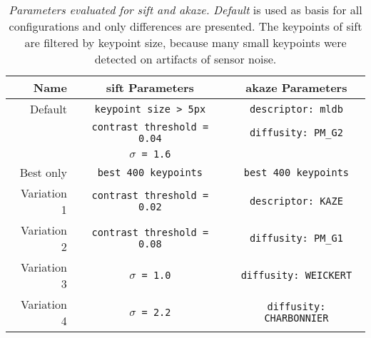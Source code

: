 \begin{table}[H]
    {\renewcommand{\arraystretch}{1.2}%
    \setlength{\tabcolsep}{0.8em}%
    \footnotesize
    \begin{tabular}{rcc}
    \toprule
    \textbf{Name}   & \textbf{\acrshort{sift} Parameters} & \textbf{\acrshort{akaze} Parameters} \\
    \midrule
        Default     & \texttt{keypoint size > 5px}        & \texttt{descriptor: \acrshort{mldb}} \\
        \null       & \texttt{contrast threshold = 0.04}  & \texttt{diffusity: PM\_G2} \\
        \null       & \texttt{$\sigma$ = 1.6}             & \null \\
        Best only   & \texttt{best 400 keypoints}         & \texttt{best 400 keypoints} \\
        Variation 1 & \texttt{contrast threshold = 0.02}  & \texttt{descriptor: KAZE} \\
        Variation 2 & \texttt{contrast threshold = 0.08}  & \texttt{diffusity: PM\_G1} \\
        Variation 3 & \texttt{$\sigma$ = 1.0}             & \texttt{diffusity: WEICKERT} \\
        Variation 4 & \texttt{$\sigma$ = 2.2}             & \texttt{diffusity: CHARBONNIER} \\
    \bottomrule
    \end{tabular}
    }
    \caption[Parameters evaluated for \acrshort{sift} and \acrshort{akaze}]{\emph{Parameters evaluated for \acrshort{sift} and \acrshort{akaze}.} \emph{Default} is used as basis for all configurations and only differences are presented. The keypoints of \acrshort{sift} are filtered by keypoint size, because many small keypoints were detected on artifacts of sensor noise.}\label{tab:sift_akaze}
\end{table}
